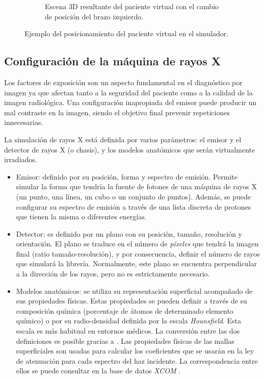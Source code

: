\begin{figure}[ht]
\begin{subfigure}[b]{0.45\linewidth}
        \caption{Escena 3D resultante del paciente virtual con el cambio de posición del brazo izquierdo.\label{subfig:US-B}}
    \end{subfigure}
    \caption{\label{fig:pose} Ejemplo del posicionamiento del paciente virtual en el simulador.}
   \end{figure}



\subsection{Configuración de la máquina de rayos X}
\label{xray:setupxray}

Los factores de exposición son un aspecto fundamental en el diagnóstico por imagen ya que afectan tanto a la seguridad del paciente como a la calidad de la imagen radiológica. Una configuración inapropiada del emisor puede producir un mal contraste en la imagen, siendo el objetivo final prevenir repeticiones innecesarias.

La simulación de rayos X está definida por varios parámetros: el emisor y el detector de rayos X (o chasis), y los modelos anatómicos que serán virtualmente irradiados. 
\begin{itemize}
    \item Emisor: definido por su posición, forma y espectro de emisión. Permite simular la forma que tendría la fuente de fotones de una máquina de rayos X (un punto, una línea, un cubo o un conjunto de puntos). Además, se puede configurar su espectro de emisión a través de una lista discreta de protones que tienen la misma o diferentes energías.
    \item Detector: es definido por un plano con su posición, tamaño, resolución y orientación. El plano se traduce en el número de \emph{píxeles} que tendrá la imagen final (ratio tamaño-resolución), y por consecuencia, definir el número de rayos que simulará la librería. Normalmente, este plano se encuentra perpendicular a la dirección de los rayos, pero no es estrictamente necesario.
    \item Modelos anatómicos: se utiliza su representación superficial acompañado de sus propiedades físicas. Estas propiedades se pueden definir a través de su composición química (porcentaje de átomos de determinado elemento químico) o por su radio-densidad definida por la escala \emph{Hounsfield}. Esta escala es más habitual en entornos médicos. La conversión entre las dos definiciones es posible gracias a \cite{Schneider2000}. Las propiedades físicas de las mallas superficiales son usadas para calcular los coeficientes que se usarán en la ley de atenuación para cada espectro del haz incidente. La correspondencia entre ellos se puede consultar en la base de datos \emph{XCOM} \cite{XCOM}.
\end{itemize}

